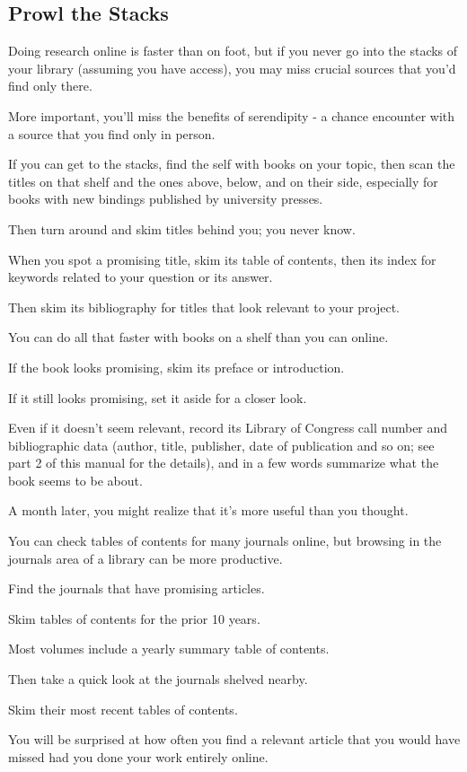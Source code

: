 \documentclass[oneside]{book}
\numberwithin{equation}{section}
\begin{document}
\subsection{Prowl the Stacks}
Doing research online is faster than on foot, but if you never go into the stacks of your library (assuming you have access), you may miss crucial sources that you'd find only there.

More important, you'll miss the benefits of serendipity - a chance encounter with a source that you find only in person.

If you can get to the stacks, find the self with books on your topic, then scan the titles on that shelf and the ones above, below, and on their side, especially for books with new bindings published by university presses.

Then turn around and skim titles behind you; you never know.

When you spot a promising title, skim its table of contents, then its index for keywords related to your question or its answer.

Then skim its bibliography for titles that look relevant to your project.

You can do all that faster with books on a shelf than you can online.

%
If the book looks promising, skim its preface or introduction.

If it still looks promising, set it aside for a closer look.

Even if it doesn't seem relevant, record its Library of Congress call number and bibliographic data (author, title, publisher, date of publication and so on; see part 2 of this manual for the details), and in a few words summarize what the book seems to be about.

A month later, you might realize that it's more useful than you thought.

%
You can check tables of contents for many journals online, but browsing in the journals area of a library can be more productive.

Find the journals that have promising articles.

Skim tables of contents for the prior 10 years.

Most volumes include a yearly summary table of contents.

Then take a quick look at the journals shelved nearby.

Skim their most recent tables of contents.

You will be surprised at how often you find a relevant article that you would have missed had you done your work entirely online.
\end{document}
